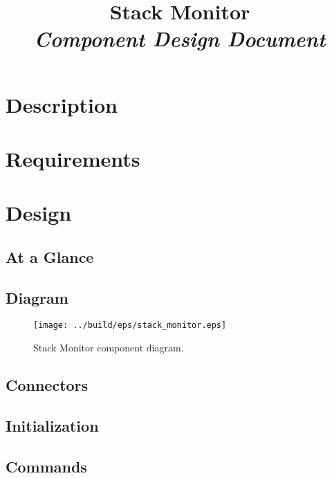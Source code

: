 



\title{\textbf{Stack Monitor} \\
\large\textit{Component Design Document}}
\date{}
\maketitle

\section{Description}


\section{Requirements}


\section{Design}

\subsection{At a Glance}


\subsection{Diagram}
\begin{figure}[H]
  \texttt{[image: ../build/eps/stack\_monitor.eps]}
  \caption{Stack Monitor component diagram.}
\end{figure}

\subsection{Connectors}


\subsection{Initialization}


\subsection{Commands}

